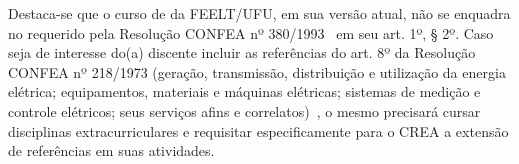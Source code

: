 Destaca-se que o curso de \nomecursonovo da FEELT/UFU, em sua versão atual, não se enquadra no requerido pela Resolução CONFEA nº 380/1993~\cite{CONFEA:380:1993} em seu art. 1º, § 2º. Caso seja de interesse do(a) discente incluir as referências do art. 8º da Resolução CONFEA nº 218/1973 (geração, transmissão, distribuição e utilização da energia elétrica; equipamentos, materiais e máquinas elétricas; sistemas de medição e controle elétricos; seus serviços afins e correlatos)~\cite{CONFEA:218:1973}, o mesmo precisará cursar disciplinas extracurriculares e requisitar especificamente para o CREA a extensão de referências em suas atividades.
